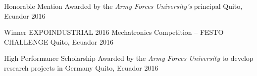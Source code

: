 \begin{cvhonors}

  \cvhonor
    {Honorable Mention}
    {Awarded by the \textit{Army Forces University's} principal}
    {Quito, Ecuador}
    {2016}

  \cvhonor
    {Winner}
    {EXPOINDUSTRIAL 2016 Mechatronics Competition – FESTO CHALLENGE}
    {Quito, Ecuador}
    {2016}

  \cvhonor
    {High Performance Scholarship}
    {Awarded by the \textit{Army Forces University} to develop research projects in Germany}
    {Quito, Ecuador}
    {2016}

\end{cvhonors}

